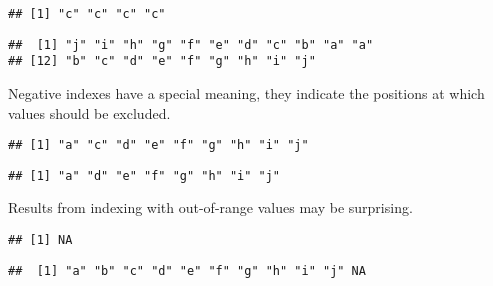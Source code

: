 \documentclass[paper=a4,10pt,div=17,headsepline,BCOR=12mm,twoside,open=right]{scrbook}\usepackage{knitr}
\begin{document}
\begin{knitrout}\footnotesize
{}\color{fgcolor}\begin{kframe}
\begin{alltt}
\hlstd{a[}\hlstd{(}\hlstd{,}\hlstd{,}\hlstd{,}\hlstd{)]}
\end{alltt}
\begin{verbatim}
## [1] "c" "c" "c" "c"
\end{verbatim}
\begin{alltt}
\hlstd{a[}\hlstd{(}\hlopt{:}\hlstd{,} \hlopt{:}\hlstd{)]}
\end{alltt}
\begin{verbatim}
##  [1] "j" "i" "h" "g" "f" "e" "d" "c" "b" "a" "a"
## [12] "b" "c" "d" "e" "f" "g" "h" "i" "j"
\end{verbatim}
\end{kframe}
\end{knitrout}

Negative indexes have a special meaning, they indicate the positions at which values should be excluded.

\begin{knitrout}\footnotesize
{}\color{fgcolor}\begin{kframe}
\begin{alltt}
\hlstd{a[}\hlopt{-}\hlstd{]}
\end{alltt}
\begin{verbatim}
## [1] "a" "c" "d" "e" "f" "g" "h" "i" "j"
\end{verbatim}
\begin{alltt}
\hlstd{a[}\hlopt{-}\hlstd{(}\hlstd{,}\hlstd{)]}
\end{alltt}
\begin{verbatim}
## [1] "a" "d" "e" "f" "g" "h" "i" "j"
\end{verbatim}
\end{kframe}
\end{knitrout}

Results from indexing with out-of-range values may be surprising.

\begin{knitrout}\footnotesize
{}\color{fgcolor}\begin{kframe}
\begin{alltt}
\hlstd{a[}\hlstd{]}
\end{alltt}
\begin{verbatim}
## [1] NA
\end{verbatim}
\begin{alltt}
\hlstd{a[}\hlopt{:}\hlstd{]}
\end{alltt}
\begin{verbatim}
##  [1] "a" "b" "c" "d" "e" "f" "g" "h" "i" "j" NA
\end{verbatim}
\end{kframe}
\end{knitrout}
\end{document}
